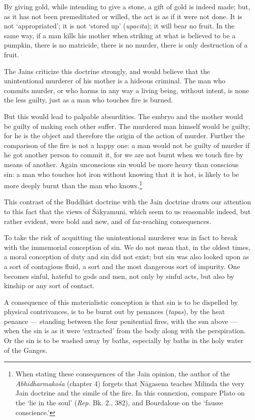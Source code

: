 \documentclass[a4paper, 11pt, oneside, english]{article}
\begin{document}
By giving gold, while intending to give a stone, a gift of gold is indeed made; but, as it has not been premeditated or willed, the act is as if it were not done. It is not `appropriated'; it is not `stored up' (\emph{upacita}); it will bear no fruit. In the same way, if a man kills his mother when striking at what is believed to be a pumpkin, there is no matricide, there is no murder, there is only destruction of a fruit.

The Jains criticize this doctrine strongly, and would believe that the unintentional murderer of his mother is a hideous criminal. The man who commits murder, or who harms in any way a living being, without intent, is none the less guilty, just as a man who touches fire is burned.

But this would lead to palpable absurdities. The embryo and the mother would be guilty of making each other suffer. The murdered man himself would be guilty, for he is the object and therefore the origin of the action of murder. Further the comparison of the fire is not a happy one: a man would not be guilty of murder if he got another person to commit it, for we are not burnt when we touch fire by means of another. Again unconscious sin would be more heavy than conscious sin: a man who touches hot iron without knowing that it is hot, is likely to be more deeply burnt than the man who knows.\footnote{When stating these consequences of the Jain opinion, the author of the \emph{Abhidharmakośa} (chapter 4) forgets that Nāgasena teaches Milinda the very Jain doctrine and the simile of the fire. In this connexion, compare Plato on the `lie in the soul' (\emph{Rep.} Bk. 2., 382), and Bourdaloue on the `fausse conscience.'}

This contrast of the Buddhist doctrine with the Jain doctrine draws our attention to this fact that the views of Śākyamuni, which seem to us reasonable indeed, but rather evident, were bold and new, and of far-reaching consequences.

To take the risk of acquitting the unintentional murderer was in fact to break with the immemorial conception of sin. We do not mean that, in the oldest times, a moral conception of duty and sin did not exist; but sin was also looked upon as a sort of contagious fluid, a sort and the most dangerous sort of impurity. One becomes sinful, hateful to gods and men, not only by sinful acts, but also by kinship or any sort of contact.

A consequence of this materialistic conception is that sin is to be dispelled by physical contrivances, is to be burnt out by penances (\emph{tapas}), by the heat penance --- standing between the four penitential fires, with the sun above --- when the sin is as it were `extracted' from the body along with the perspiration. Or the sin is to be washed away by baths, especially by baths in the holy water of the Ganges.
\end{document}
